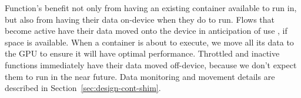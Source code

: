 Function's benefit not only from having an existing container available to run in, but also from having their data on-device when they do to run.
Flows that become active have their data moved onto the device in anticipation of use , if space is available.
When a container is about to execute, we move all its data to the GPU to ensure it will have optimal performance.
Throttled and inactive functions immediately have their data moved off-device, because we don't expect them to run in the near future.
Data monitoring and movement details are described in Section~\ref{sec:design-cont-shim}. 

